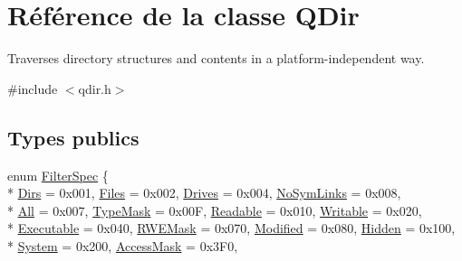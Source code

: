 \hypertarget{class_q_dir}{}\section{Référence de la classe Q\+Dir}
\label{class_q_dir}


Traverses directory structures and contents in a platform-\/independent way.  




{\ttfamily \#include $<$qdir.\+h$>$}

\subsection*{Types publics}
\begin{DoxyCompactItemize}
\item 
enum \hyperlink{class_q_dir_a8b8c5b4f0028081f094c85129b8cc8b1}{Filter\+Spec} \{ \\*
\hyperlink{class_q_dir_a8b8c5b4f0028081f094c85129b8cc8b1aec15ecbbb66c4035f1beac420620c455}{Dirs} = 0x001, 
\hyperlink{class_q_dir_a8b8c5b4f0028081f094c85129b8cc8b1a24042aebd6c53e6c913b359fb2271b12}{Files} = 0x002, 
\hyperlink{class_q_dir_a8b8c5b4f0028081f094c85129b8cc8b1a708a9ec117537510e1871c096617cac2}{Drives} = 0x004, 
\hyperlink{class_q_dir_a8b8c5b4f0028081f094c85129b8cc8b1a9cdaf38ee54b903bb6cd3bc00444e046}{No\+Sym\+Links} = 0x008, 
\\*
\hyperlink{class_q_dir_a8b8c5b4f0028081f094c85129b8cc8b1a6a41a0538f66bdc9d57e12c15da80352}{All} = 0x007, 
\hyperlink{class_q_dir_a8b8c5b4f0028081f094c85129b8cc8b1a0cafe3372b457a38a86c045c617c5bbd}{Type\+Mask} = 0x00\+F, 
\hyperlink{class_q_dir_a8b8c5b4f0028081f094c85129b8cc8b1ac12c5e5cd2ee45d09190a0b0a47c8548}{Readable} = 0x010, 
\hyperlink{class_q_dir_a8b8c5b4f0028081f094c85129b8cc8b1ac41aa37937c831406cbdf39639deefc0}{Writable} = 0x020, 
\\*
\hyperlink{class_q_dir_a8b8c5b4f0028081f094c85129b8cc8b1a0b1d1933226ee3a3b9af43260eefccda}{Executable} = 0x040, 
\hyperlink{class_q_dir_a8b8c5b4f0028081f094c85129b8cc8b1af3293542b2a3757f2af666ae41941821}{R\+W\+E\+Mask} = 0x070, 
\hyperlink{class_q_dir_a8b8c5b4f0028081f094c85129b8cc8b1a27a59f1a04c63b278aa9c486e4aab533}{Modified} = 0x080, 
\hyperlink{class_q_dir_a8b8c5b4f0028081f094c85129b8cc8b1a45175d70d3af4f89973fa88076d58821}{Hidden} = 0x100, 
\\*
\hyperlink{class_q_dir_a8b8c5b4f0028081f094c85129b8cc8b1ada244a6ba6ca9587ebffeefa65ce8d6b}{System} = 0x200, 
\hyperlink{class_q_dir_a8b8c5b4f0028081f094c85129b8cc8b1a62a191157b0ccf07f8b289a93c73c071}{Access\+Mask} = 0x3\+F0, 

\end{DoxyCompactItemize}

